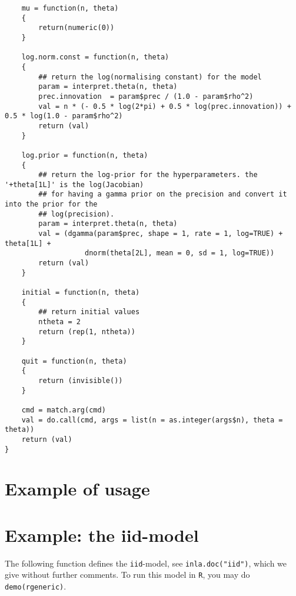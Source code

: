 \documentclass[a4paper,11pt]{article}
\begin{document}
{\begin{verbatim}
    mu = function(n, theta)
    {
        return(numeric(0))
    }

    log.norm.const = function(n, theta)
    {
        ## return the log(normalising constant) for the model
        param = interpret.theta(n, theta)
        prec.innovation  = param$prec / (1.0 - param$rho^2)
        val = n * (- 0.5 * log(2*pi) + 0.5 * log(prec.innovation)) + 0.5 * log(1.0 - param$rho^2)
        return (val)
    }

    log.prior = function(n, theta)
    {
        ## return the log-prior for the hyperparameters. the '+theta[1L]' is the log(Jacobian)
        ## for having a gamma prior on the precision and convert it into the prior for the
        ## log(precision).
        param = interpret.theta(n, theta)
        val = (dgamma(param$prec, shape = 1, rate = 1, log=TRUE) + theta[1L] + 
                   dnorm(theta[2L], mean = 0, sd = 1, log=TRUE))
        return (val)
    }

    initial = function(n, theta)
    {
        ## return initial values
        ntheta = 2
        return (rep(1, ntheta))
    }

    quit = function(n, theta)
    {
        return (invisible())
    }

    cmd = match.arg(cmd)
    val = do.call(cmd, args = list(n = as.integer(args$n), theta = theta))
    return (val)
}
\end{verbatim}
}

\section*{Example of usage}

{\small

}

\section*{Example: the iid-model}

The following function defines the \texttt{iid}-model, see
\texttt{inla.doc("iid")}, which we give without further comments. To
run this model in \texttt{R}, you may do \texttt{demo(rgeneric)}.
\end{document}
